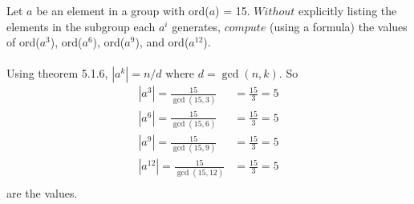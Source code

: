 \documentclass[titlepage]{article}
\newenvironment{problem}[2][Problem]{\begin{trivlist}
\item[\hskip \labelsep {\bfseries #1}\hskip \labelsep {\bfseries #2.}]}{\end{trivlist}}
\begin{document}
\begin{problem}{6}

\end{problem}

\begin{problem}{7}
Let $a$ be an element in a group with ord($a$) = 15. $Without$ explicitly listing the elements in the subgroup each $a^i$ generates, $compute$ (using a formula) the values of ord($a^3$), ord($a^6$), ord($a^9$), and ord($a^{12}$). \\ \\ Using theorem 5.1.6, $|a^k| = n/d $ where $d=\gcd(n,k)$. So
\begin{align*}
|a^3| = \frac{15}{\gcd(15,3)} &= \frac{15}{3} =5 \\
|a^6| = \frac{15}{\gcd(15,6)} &= \frac{15}{3} =5 \\
|a^9| = \frac{15}{\gcd(15,9)} &= \frac{15}{3} = 5 \\
|a^{12}|= \frac{15}{\gcd(15,12)} &= \frac{15}{3} = 5 \\
\end{align*}
are the values.
\end{problem}
\end{document}
